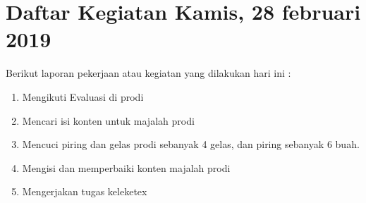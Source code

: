 \section{Daftar Kegiatan Kamis, 28 februari 2019}
Berikut laporan pekerjaan atau kegiatan yang dilakukan hari ini :
\begin{enumerate}
\item Mengikuti Evaluasi di prodi
\item Mencari isi konten untuk majalah prodi
\item Mencuci piring dan gelas prodi sebanyak 4 gelas, dan piring sebanyak 6 buah. 
\item Mengisi dan memperbaiki konten majalah prodi
\item Mengerjakan tugas keleketex
\end {enumerate}

